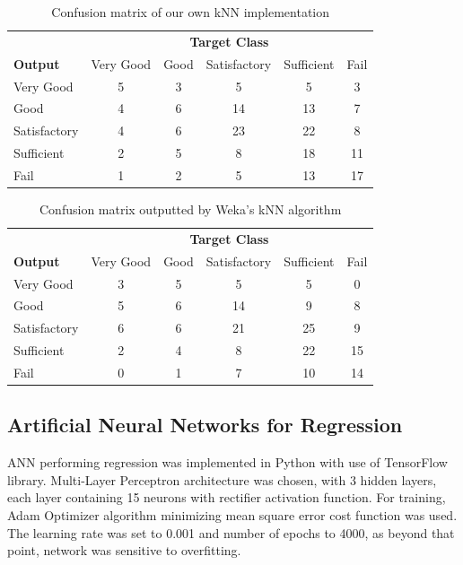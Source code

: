 \begin{table}[h]
  \begin{tabular}{l|ccccc}
     & \multicolumn{5}{c}{\textbf{Target Class}} \\ 
  \textbf{Output} & Very Good & Good & Satisfactory & Sufficient & Fail \\  \hline
  Very Good  & 5 & 3 & 5 & 5 & 3\\
     Good & 4 & 6 & 14 & 13 & 7\\
     Satisfactory & 4 & 6 & 23 & 22 & 8\\
     Sufficient & 2 & 5 & 8 & 18 & 11\\
     Fail & 1 & 2 & 5 & 13 & 17\\
  \end{tabular}
  \caption{Confusion matrix of our own kNN implementation}
  \label{tab:kNNmultiOwn}
\end{table}

\begin{table}[h]
  \begin{tabular}{l|ccccc}
     & \multicolumn{5}{c}{\textbf{Target Class}} \\ 
  \textbf{Output} & Very Good & Good & Satisfactory & Sufficient & Fail \\  \hline
  Very Good  & 3 & 5 & 5 & 5 & 0\\
     Good & 5 & 6 & 14 & 9 & 8\\
     Satisfactory & 6 & 6 & 21 & 25 & 9\\
     Sufficient & 2 & 4 & 8 & 22 & 15\\
     Fail & 0 & 1 & 7 & 10 & 14\\
  \end{tabular}
  \caption{Confusion matrix outputted by Weka's kNN algorithm}
  \label{tab:kNNmultiWeka}
\end{table}

\subsection{Artificial Neural Networks for Regression}
ANN performing regression was implemented in Python with use of TensorFlow library. Multi-Layer Perceptron architecture was chosen, with 3 hidden layers, each layer containing 15 neurons with rectifier activation function. For training, Adam Optimizer algorithm minimizing mean square error cost function was used. The learning rate was set to 0.001 and number of epochs to 4000, as beyond that point, network was sensitive to overfitting.


